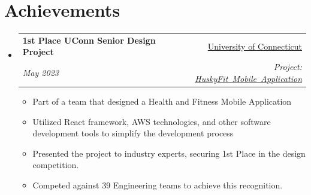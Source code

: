 \documentclass[a4paper,11pt]{article}
\makeatletter
\newcommand{\resumeItemCustom}[2]{
  \item\small{
    \textbf{#1}{ #2 \vspace{-2pt}}
  }
}
\newcommand{\resumeSubheading}[4]{
  \vspace{-1pt}\item
    \begin{tabular*}{0.97\textwidth}{l@{\extracolsep{\fill}}r}
      \textbf{#1} & #2 \\
      \textit{#3} & \textit{#4} \\
    \end{tabular*}\vspace{-5pt}
}
\newcommand{\resumeSubHeadingListStart}{\begin{itemize}[leftmargin=*]}
\newcommand{\resumeSubHeadingListEnd}{\end{itemize}}
\newcommand{\resumeItemListStart}{\begin{itemize}}
\newcommand{\resumeItemListEnd}{\end{itemize}\vspace{-5pt}}
\makeatother
\begin{document}
\section{Achievements}
\resumeSubHeadingListStart
    \resumeSubheading
        {1st Place UConn Senior Design Project}
        {\href{https://uconn.edu/}{University of Connecticut}}{May 2023}
        {Project: \href{https://seniordesignday.engr.uconn.edu/seniorprojectpt/senior-design-2023-computer-science-and-engineering-team-05/}{\mbox{HuskyFit Mobile Application}}}
        \resumeItemListStart
            \resumeItemCustom{}{Part of a team that designed a Health and Fitness Mobile Application}
            \resumeItemCustom{}{Utilized React framework, AWS technologies, and other software development tools to simplify the development process }
            \resumeItemCustom{}{Presented the project to industry experts, securing 1st Place in the design competition.}
            \resumeItemCustom{}{Competed against 39 Engineering teams to achieve this recognition.}
        \resumeItemListEnd
\resumeSubHeadingListEnd

\end{document}
